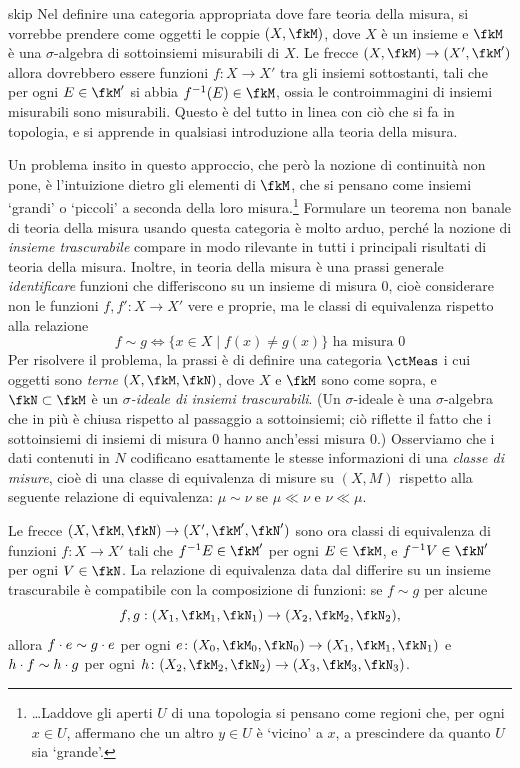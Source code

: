 \begin{hExample}{skip}\label{ex_cat_meas}
 Nel definire una categoria appropriata dove fare teoria della misura, si vorrebbe prendere come oggetti le coppie \((X, \fkM)\), dove \(X\) è un insieme e \(\fkM\) è una \(\sigma\)-algebra di sottoinsiemi misurabili di \(X\). Le frecce \((X, \fkM) \to (X', \fkM')\) allora dovrebbero essere funzioni \(f\colon X \to X'\) tra gli insiemi sottostanti, tali che per ogni \(E \in \fkM'\) si abbia \(f^{-1}(E) \in \fkM\), ossia le controimmagini di insiemi misurabili sono misurabili. Questo è del tutto in linea con ciò che si fa in topologia, e si apprende in qualsiasi introduzione alla teoria della misura.

 Un problema insito in questo approccio, che però la nozione di continuità non pone, è l'intuizione dietro gli elementi di \(\fkM\), che si pensano come insiemi `grandi' o `piccoli' a seconda della loro misura.\footnote{\dots Laddove gli aperti \(U\) di una topologia si pensano come regioni che, per ogni \(x\in U\), affermano che un altro \(y\in U\) è `vicino' a \(x\), a prescindere da quanto \(U\) sia `grande'.} Formulare un teorema non banale di teoria della misura usando questa categoria è molto arduo, perché la nozione di \emph{insieme trascurabile} compare in modo rilevante in tutti i principali risultati di teoria della misura. Inoltre, in teoria della misura è una prassi generale \emph{identificare} funzioni che differiscono su un insieme di misura \(0\), cioè considerare non le funzioni \(f,f' \colon X\to X'\) vere e proprie, ma le classi di equivalenza rispetto alla relazione
 \[f\sim g \iff \{x\in X\mid f(x)\ne g(x)\} \text{ ha misura } 0\]
 Per risolvere il problema, la prassi è di definire una categoria \(\ctMeas\) i cui oggetti sono \emph{terne} \((X, \fkM, \fkN)\), dove \(X\) e \(\fkM\) sono come sopra, e \(\fkN \subset \fkM\) è un \emph{\(\sigma\)-ideale di insiemi trascurabili}. (Un \(\sigma\)-ideale è una \(\sigma\)-algebra che in più è chiusa rispetto al passaggio a sottoinsiemi; ciò riflette il fatto che i sottoinsiemi di insiemi di misura \(0\) hanno anch'essi misura \(0\).) Osserviamo che i dati contenuti in \(N\) codificano esattamente le stesse informazioni di una \emph{classe di misure}, cioè di una classe di equivalenza di misure su \((X, M)\) rispetto alla seguente relazione di equivalenza: \(\mu \sim \nu\) se \(\mu \ll \nu\) e \(\nu \ll \mu\).

 Le frecce \((X, \fkM, \fkN) \to (X', \fkM', \fkN')\) sono ora classi di equivalenza di funzioni \(f\colon X \to X'\) tali che \(f^{-1}E \in \fkM'\) per ogni \(E\in \fkM\), e \(f^{-1}V \in \fkN'\) per ogni \(V\in \fkN\). La relazione di equivalenza data dal differire su un insieme trascurabile è compatibile con la composizione di funzioni: se \(f \sim g\) per alcune
 \[
  f,g : (X_1, \fkM_1, \fkN_1) \to (X_2, \fkM_2, \fkN_2),
 \]
 allora \(f\cdot e \sim g\cdot e\) per ogni \(e\colon (X_0, \fkM_0, \fkN_0) \to (X_1, \fkM_1, \fkN_1)\) e \(h\cdot f \sim h\cdot g\) per ogni \(h\colon (X_2, \fkM_2, \fkN_2) \to (X_3, \fkM_3, \fkN_3)\).
\end{hExample}
